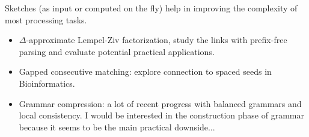 \documentclass[aspectratio=169]{beamer}
\begin{document}
\begin{frame}
  \begin{center}
  \end{center}
   Sketches (as input or computed on the fly) help in improving the complexity of most processing tasks.

  \medskip
  \begin{itemize}
    \item {} $\Delta$-approximate Lempel-Ziv factorization, study the links with prefix-free parsing and evaluate potential practical applications.
    \item Gapped consecutive matching: explore connection to spaced seeds in Bioinformatics.
    \item Grammar compression: a lot of recent progress with balanced grammars and local consistency. I would be interested in the construction phase of grammar because it seems to be the main practical downside...
  \end{itemize}

  \vfill
  \begin{center}
  \end{center}
\end{frame}

\backupbegin



\begin{frame}
  \tableofcontents
\end{frame}
\backupend
\end{document}
